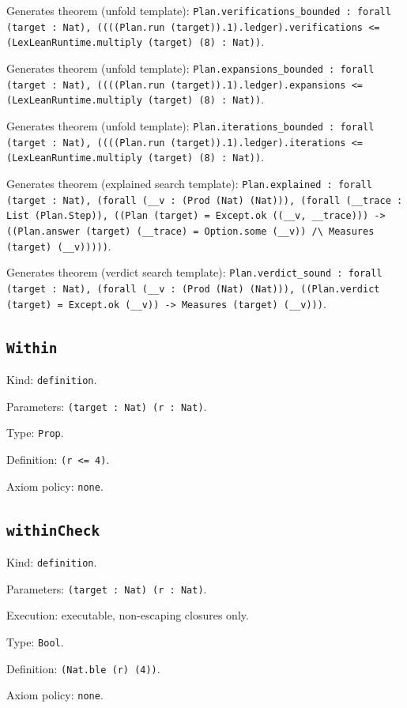 \documentclass[11pt]{article}
\begin{document}
\noindent Generates theorem (unfold template): \texttt{Plan.verifications\_bounded : forall (target : Nat), ((((Plan.run (target)).1).ledger).verifications <= (LexLeanRuntime.multiply (target) (8) : Nat))}.\par
\noindent Generates theorem (unfold template): \texttt{Plan.expansions\_bounded : forall (target : Nat), ((((Plan.run (target)).1).ledger).expansions <= (LexLeanRuntime.multiply (target) (8) : Nat))}.\par
\noindent Generates theorem (unfold template): \texttt{Plan.iterations\_bounded : forall (target : Nat), ((((Plan.run (target)).1).ledger).iterations <= (LexLeanRuntime.multiply (target) (8) : Nat))}.\par
\noindent Generates theorem (explained search template): \texttt{Plan.explained : forall (target : Nat), (forall (\_\_v : (Prod (Nat) (Nat))), (forall (\_\_trace : List (Plan.Step)), ((Plan (target) = Except.ok ((\_\_v, \_\_trace))) -> ((Plan.answer (target) (\_\_trace) = Option.some (\_\_v)) /\textbackslash{} Measures (target) (\_\_v)))))}.\par
\noindent Generates theorem (verdict search template): \texttt{Plan.verdict\_sound : forall (target : Nat), (forall (\_\_v : (Prod (Nat) (Nat))), ((Plan.verdict (target) = Except.ok (\_\_v)) -> Measures (target) (\_\_v)))}.\par
\subsection*{\texttt{Within}}
\noindent Kind: \texttt{definition}.\par
\noindent Parameters: \texttt{(target : Nat) (r : Nat)}.\par
\noindent Type: \texttt{Prop}.\par
\noindent Definition: \texttt{(r <= 4)}.\par
\noindent Axiom policy: \texttt{none}.\par
\subsection*{\texttt{withinCheck}}
\noindent Kind: \texttt{definition}.\par
\noindent Parameters: \texttt{(target : Nat) (r : Nat)}.\par
\noindent Execution: executable, non-escaping closures only.\par
\noindent Type: \texttt{Bool}.\par
\noindent Definition: \texttt{(Nat.ble (r) (4))}.\par
\noindent Axiom policy: \texttt{none}.\par
\end{document}
